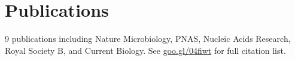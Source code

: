 \documentclass[]{Finlay_Maguire_CV}
\begin{document}
\begin{minipage}[t]{0.66\textwidth}
\sectionsep

\vspace{-0.3cm}
\section{Publications} 
%
%
9 publications including Nature Microbiology, PNAS, Nucleic Acids Research, Royal Society B, and Current Biology.
See \url{goo.gl/04fiwt} for full citation list.

\end{minipage}
\end{document}
